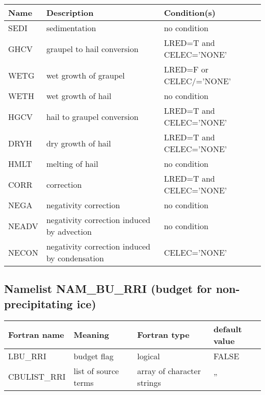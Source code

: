 \begin{longtable} {|p{}|p{}|p{}|}
\hline
Name & Description & Condition(s) \\
\hline \hline
\endhead
SEDI   & sedimentation                                 & no condition \\\hline
GHCV   & graupel to hail conversion                    & LRED=T and CELEC='NONE' \\\hline
WETG   & wet growth of graupel                         & LRED=F or CELEC/='NONE' \\\hline
WETH   & wet growth of hail                            & no condition \\\hline
HGCV   & hail to graupel conversion                    & LRED=T and CELEC='NONE' \\\hline
DRYH   & dry growth of hail                            & LRED=T and CELEC='NONE' \\\hline
HMLT   & melting of hail                               & no condition \\\hline
CORR   & correction                                    & LRED=T and CELEC='NONE' \\\hline
NEGA   & negativity correction                         & no condition \\\hline
NEADV  & negativity correction induced by advection    & no condition \\\hline
NECON  & negativity correction induced by condensation & CELEC='NONE' \\\hline
\end{longtable}


\subsection{Namelist NAM\_BU\_RRI (budget for non-precipitating ice)}

\begin{longtable} {|p{}|p{}|>{\centering}p{}|p{}<{\centering}|}
\hline
Fortran name & Meaning & Fortran type & default value \\
\hline \hline
\endhead
LBU\_RRI & budget flag & logical & FALSE\index{LBU\_RRI!\innam{NAM\_BU\_RRI}} \\\hline
CBULIST\_RRI & list of source terms & array of character strings & ''\index{CBULIST\_RRI!\innam{NAM\_BU\_RRI}} \\\hline
\end{longtable}

